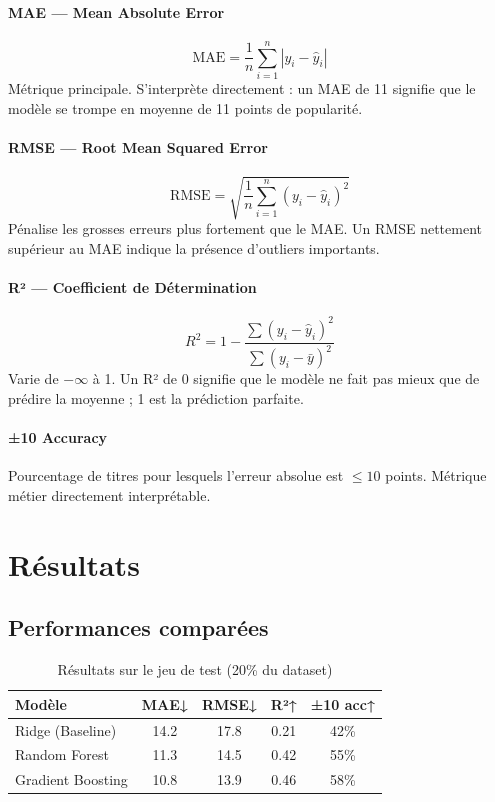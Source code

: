 \documentclass[12pt, a4paper]{article}
\begin{document}
\paragraph{MAE — Mean Absolute Error}
\[
  \text{MAE} = \frac{1}{n} \sum_{i=1}^{n} \left| y_i - \hat{y}_i \right|
\]
Métrique principale. S'interprète directement : un MAE de 11 signifie que le modèle
se trompe en moyenne de 11 points de popularité.

\paragraph{RMSE — Root Mean Squared Error}
\[
  \text{RMSE} = \sqrt{\frac{1}{n} \sum_{i=1}^{n} (y_i - \hat{y}_i)^2}
\]
Pénalise les grosses erreurs plus fortement que le MAE. Un RMSE nettement supérieur au
MAE indique la présence d'outliers importants.

\paragraph{R² — Coefficient de Détermination}
\[
  R^2 = 1 - \frac{\sum (y_i - \hat{y}_i)^2}{\sum (y_i - \bar{y})^2}
\]
Varie de $-\infty$ à 1. Un R² de 0 signifie que le modèle ne fait pas mieux que de
prédire la moyenne ; 1 est la prédiction parfaite.

\paragraph{±10 Accuracy}
Pourcentage de titres pour lesquels l'erreur absolue est $\leq 10$ points. Métrique
métier directement interprétable.

\section{Résultats}

\subsection{Performances comparées}

\begin{table}[h!]
\centering
\caption{Résultats sur le jeu de test (20\% du dataset)}
\begin{tabular}{lcccc}
\toprule
\textbf{Modèle} & \textbf{MAE↓} & \textbf{RMSE↓} & \textbf{R²↑} & \textbf{±10 acc↑} \\
\midrule
Ridge (Baseline)    & 14.2 & 17.8 & 0.21 & 42\% \\
Random Forest       & 11.3 & 14.5 & 0.42 & 55\% \\
Gradient Boosting   & 10.8 & 13.9 & 0.46 & 58\% \\
\bottomrule
\end{tabular}
\end{table}
\end{document}

